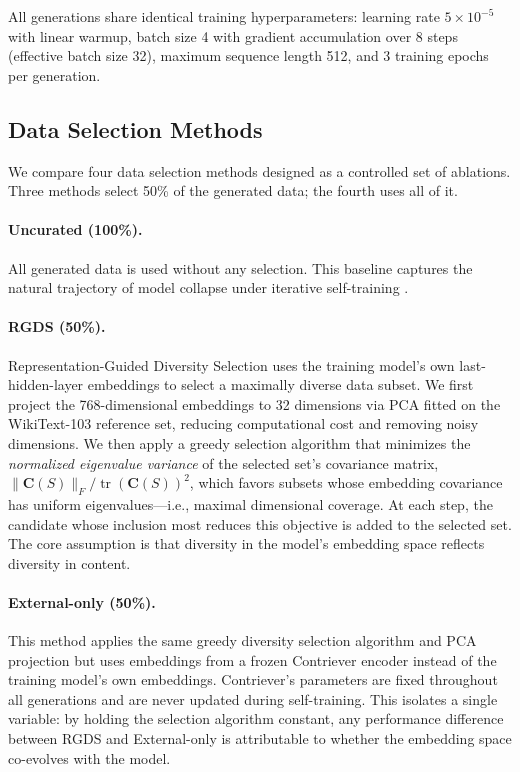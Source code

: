 All generations share identical training hyperparameters: learning rate $5 \times 10^{-5}$ with linear warmup, batch size 4 with gradient accumulation over 8 steps (effective batch size 32), maximum sequence length 512, and 3 training epochs per generation.

\subsection{Data Selection Methods}

We compare four data selection methods designed as a controlled set of ablations. Three methods select 50\% of the generated data; the fourth uses all of it.

\paragraph{Uncurated (100\%).} All generated data is used without any selection. This baseline captures the natural trajectory of model collapse under iterative self-training \citep{shumailov2024ai, alemohammad2024self}.

\paragraph{RGDS (50\%).} Representation-Guided Diversity Selection uses the training model's own last-hidden-layer embeddings to select a maximally diverse data subset. We first project the 768-dimensional embeddings to 32 dimensions via PCA fitted on the WikiText-103 reference set, reducing computational cost and removing noisy dimensions. We then apply a greedy selection algorithm that minimizes the \emph{normalized eigenvalue variance} of the selected set's covariance matrix, $\lVert \mathbf{C}(S) \rVert_F / \operatorname{tr}(\mathbf{C}(S))^2$, which favors subsets whose embedding covariance has uniform eigenvalues---i.e., maximal dimensional coverage. At each step, the candidate whose inclusion most reduces this objective is added to the selected set. The core assumption is that diversity in the model's embedding space reflects diversity in content.

\paragraph{External-only (50\%).} This method applies the same greedy diversity selection algorithm and PCA projection but uses embeddings from a frozen Contriever encoder \citep{izacard2022unsupervised} instead of the training model's own embeddings. Contriever's parameters are fixed throughout all generations and are never updated during self-training. This isolates a single variable: by holding the selection algorithm constant, any performance difference between RGDS and External-only is attributable to whether the embedding space co-evolves with the model.

